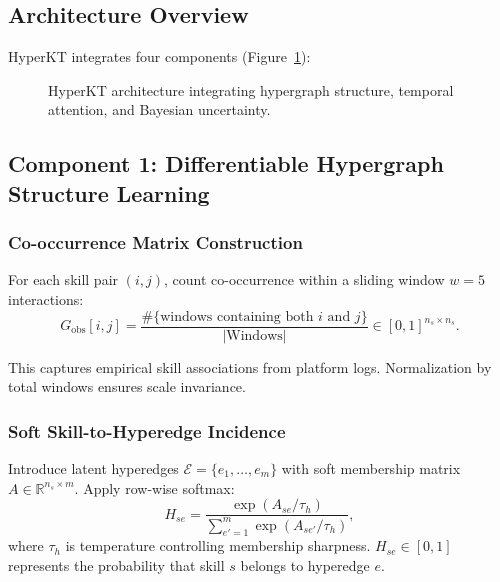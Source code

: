 \documentclass[preprint,12pt]{elsarticle}
\begin{document}
\subsection{Architecture Overview}

HyperKT integrates four components (Figure~\ref{fig:architecture}):

\begin{figure}[H]\centering
{}
\caption{HyperKT architecture integrating hypergraph structure, temporal attention, and Bayesian uncertainty.}\label{fig:architecture}
\end{figure}

\subsection{Component 1: Differentiable Hypergraph Structure Learning}\label{subsec:hypergraph}

\subsubsection{Co-occurrence Matrix Construction}

For each skill pair $(i, j)$, count co-occurrence within a sliding window $w=5$ interactions:
\begin{equation}
G_{\text{obs}}[i,j] = \frac{\#\{\text{windows containing both } i \text{ and } j\}}{|\text{Windows}|} \in [0, 1]^{n_s \times n_s}.
\label{eq:cooccurrence}
\end{equation}

This captures empirical skill associations from platform logs. Normalization by total windows ensures scale invariance.

\subsubsection{Soft Skill-to-Hyperedge Incidence}

Introduce latent hyperedges $\mathcal{E} = \{e_1, \ldots, e_m\}$ with soft membership matrix $A \in \mathbb{R}^{n_s \times m}$. Apply row-wise softmax:
\begin{equation}
H_{se} = \frac{\exp(A_{se} / \tau_h)}{\sum_{e'=1}^{m} \exp(A_{se'} / \tau_h)},
\label{eq:softmax-assign}
\end{equation}
where $\tau_h$ is temperature controlling membership sharpness. $H_{se} \in [0,1]$ represents the probability that skill $s$ belongs to hyperedge $e$.
\end{document}
